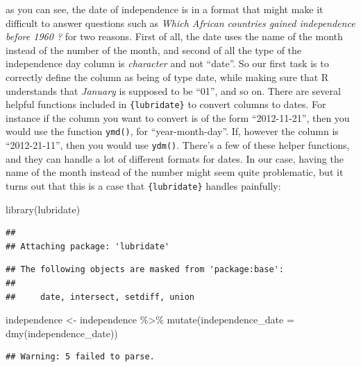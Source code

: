 \documentclass[
]{article}
\newenvironment{Shaded}{\begin{snugshade}}{\end{snugshade}}
\newcommand{\AttributeTok}[1]{\textcolor[rgb]{0.77,0.63,0.00}{#1}}
\newcommand{\FunctionTok}[1]{\textcolor[rgb]{0.00,0.00,0.00}{#1}}
\newcommand{\NormalTok}[1]{#1}
\newcommand{\OtherTok}[1]{\textcolor[rgb]{0.56,0.35,0.01}{#1}}
\newcommand{\SpecialCharTok}[1]{\textcolor[rgb]{0.00,0.00,0.00}{#1}}
\begin{document}
as you can see, the date of independence is in a format that might make it difficult to answer questions
such as \emph{Which African countries gained independence before 1960 ?} for two reasons. First of all,
the date uses the name of the month instead of the number of the month, and second of all the type of
the independence day column is \emph{character} and not ``date''. So our first task is to correctly define the column
as being of type date, while making sure that R understands that \emph{January} is supposed to be ``01'', and so
on. There are several helpful functions included in \texttt{\{lubridate\}} to convert columns to dates. For instance
if the column you want to convert is of the form ``2012-11-21'', then you would use the function \texttt{ymd()},
for ``year-month-day''. If, however the column is ``2012-21-11'', then you would use \texttt{ydm()}. There's
a few of these helper functions, and they can handle a lot of different formats for dates. In our case,
having the name of the month instead of the number might seem quite problematic, but it turns out
that this is a case that \texttt{\{lubridate\}} handles painfully:

\begin{Shaded}
\begin{Highlighting}[]
\FunctionTok{library}\NormalTok{(lubridate)}
\end{Highlighting}
\end{Shaded}

\begin{verbatim}
## 
## Attaching package: 'lubridate'
\end{verbatim}

\begin{verbatim}
## The following objects are masked from 'package:base':
## 
##     date, intersect, setdiff, union
\end{verbatim}

\begin{Shaded}
\begin{Highlighting}[]
\NormalTok{independence }\OtherTok{\textless{}{-}}\NormalTok{ independence }\SpecialCharTok{\%\textgreater{}\%}
  \FunctionTok{mutate}\NormalTok{(}\AttributeTok{independence\_date =} \FunctionTok{dmy}\NormalTok{(independence\_date))}
\end{Highlighting}
\end{Shaded}

\begin{verbatim}
## Warning: 5 failed to parse.
\end{verbatim}
\end{document}
